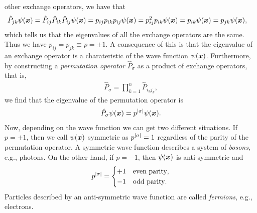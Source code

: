         other exchange operators, we have that
        \begin{align}
            \hat{P}_{jk} \psi(\boldsymbol{x})
            &= \hat{P}_{ij} \hat{P}_{ik} \hat{P}_{ij} \psi(\boldsymbol{x})
            = p_{ij} p_{ik} p_{ij} \psi(\boldsymbol{x})
            = p_{ij}^2 p_{ik} \psi(\boldsymbol{x})
            = p_{ik} \psi(\boldsymbol{x})
             = p_{jk} \psi(\boldsymbol{x}),
        \end{align}
        which tells us that the eigenvalues of all the exchange operators are
        the same.
        Thus we have $p_{ij} = p_{jk} \equiv p = \pm 1$.
        A consequence of this is that the eigenvalue of an exchange operator is
        a charateristic of the wave function $\psi(\boldsymbol{x})$.
        Furthermore, by constructing a \emph{permutation operator}
        $\hat{P}_{\sigma}$ as a product of exchange operators, that is,
        \begin{align}
            \hat{P}_{\sigma}
            = \prod_{k = 1}^{n} \hat{P}_{i_k j_k},
        \end{align}
        we find that the eigenvalue of the permutation operator is
        \begin{align}
            \hat{P}_{\sigma}\psi(\boldsymbol{x})
            = p^{\abs{\sigma}}\psi(\boldsymbol{x}).
        \end{align}
        Now, depending on the wave function we can get two different situations.
        If $p = +1$, then we call $\psi(\boldsymbol{x})$ symmetric as $p^{\abs{\sigma}}
        = 1$ regardless of the parity of the permutation operator.
        A symmetric wave function describes a system of \emph{bosons}, e.g.,
        photons.
        On the other hand, if $p = -1$, then $\psi(\boldsymbol{x})$ is anti-symmetric
        and
        \begin{align}
            p^{\abs{\sigma}} =
            \begin{cases}
                +1 & \text{even parity}, \\
                -1 & \text{odd parity}.
            \end{cases}
        \end{align}
        Particles described by an anti-symmetric wave function are called
        \emph{fermions}, e.g., electrons.


